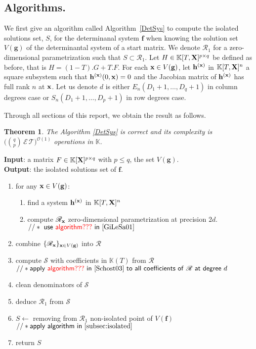 \documentclass[11pt]{article}
\numberwithin{Property}{section}
\newtheorem{Theorem}{Theorem}%
\numberwithin{Theorem}{section}
\numberwithin{Proposition}{section}
\numberwithin{Lemma}{section}
\numberwithin{Corollary}{section}
\numberwithin{Definition}{section}
\numberwithin{Remark}{section}
\numberwithin{Conjecture}{section}
\numberwithin{Problem}{section}
\numberwithin{Claim}{section}
\theoremstyle{definition}
\numberwithin{Example}{section}
\def\f {\ensuremath{\mathbf{f}}}
\def\h {\ensuremath{\mathbf{h}}}
\def\g {\ensuremath{\mathbf{g}}}
\renewcommand{\leq}{\leqslant}
\newcommand{\bigO}[1]{\mathcal{O}(#1)} %
\newcommand{\field}{\mathbb{K}} %
\newcommand{\mat}[1]{\mathbf{\MakeUppercase{#1}}} %
\newcommand{\todo}[1]{\textcolor{red}{#1}} %
\begin{document}
\subsection{Algorithms.} We first give an algorithm called Algorithm~\ref{DetSys} to compute the isolated solutions set, $S$,  for the determinanal system $\f$ when knowing the solution set $V(\g)$ of the determinantal system of a start matrix. We denote $\mathscr{R}_{1}$ for a zero-dimensional parametrization such that $S \subset \mathscr{R}_{1}$. Let $H \in \field[T, \mat{X}]^{p \times q}$ be defined as before, that is $H = (1 - T).G + T.F$. For each ${\bf x} \in V(\g)$, let $\h^{(\bf x)}$ in $\field[T,\mat{X}]^n$ a square subsystem such that $\h^{(\bf x)}(0,{\bf x}) = 0$ and the Jacobian matrix of $\h^{(\bf x)}$ has full rank $n$ at ${\bf x}$. Let us denote $d$ is either $E_{n}(D_1+1, \ldots, D_q+1)$ in column degrees case or $S_{n}(D_1+1, \ldots, D_p+1)$ in row degrees case. 

Through all sections of this report, we obtain the result as follows.
\begin{Theorem}
The Algorithm \ref{DetSys} is correct and its complexity is $\big({{q}\choose{p}} \,\mathcal{E}\,\mathcal{T}\big)^{\bigO{1}}$ operations in $\field$.
\end{Theorem}
\begin{algorithm}
\caption{$\mathsf{Determinantal System}$}
\label{DetSys}
{\bf Input}: a matrix $F \in \field[\mat{X}]^{p \times q}$ with $p \leq q$, the set $V(\g)$.\\
{\bf Output}: the isolated solutions set of $\f$. 
\begin{enumerate}
\item for any ${\bf x} \in V(\g)$: 
\begin{enumerate}
\item find a system $\h^{(\bf x)}$ in $\field[T,\mat{X}]^n$
\item compute $\mathscr{R}_{\bf x}$ zero-dimensional parametrization at precision $2d$. \\
$\mathsf{//* \ use \ \todo{algorithm???} \ in~\cite{GiLeSa01} \ }$
\end{enumerate}
\item combine $\{\mathscr{R}_{\bf x}\}_{{\bf x} \in V(\g)}$ into $\mathscr{R}$
\item compute $\mathscr{S}$ with coefficients in $\field(T)$ from  $\mathscr{R}$\\
$\mathsf{//* apply \ \todo{algorithm???} \ in~\cite{Schost03} \ to \ all \ coefficients \ of \ \mathscr{R} \ at \ degree} \ d$
\item clean denominators of $\mathscr{S}$
\item deduce $\mathscr{R}_{1}$ from $\mathscr{S}$
\item  $S \gets$ removing from $\mathscr{R}_{1}$ non-isolated point of $V(\f)$\\
$\mathsf{//* apply \ algorithm \ in~\cref{subsec:isolated}}$
\item return $S$
\end{enumerate}
\end{algorithm}
\end{document}
